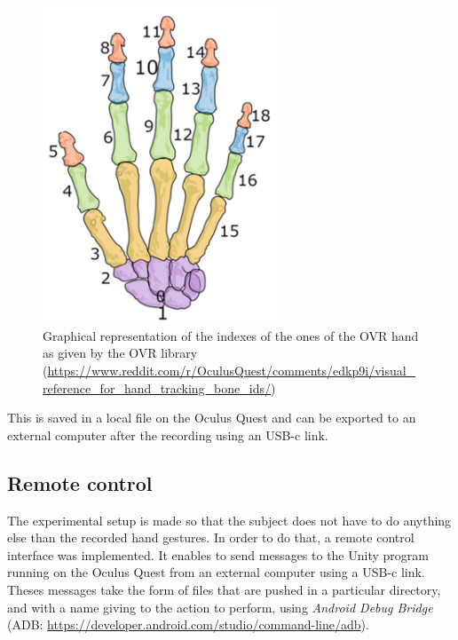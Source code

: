 \documentclass{article}
\begin{document}
\begin{figure}[H]
    \centering
    \includegraphics[width=7cm]{images/ovrHandBonesIndexes.png}
    \caption{Graphical representation of the indexes of the ones of the OVR hand as given by the OVR library (\url{https://www.reddit.com/r/OculusQuest/comments/edkp9i/visual_reference_for_hand_tracking_bone_ids/})}
    \label{fig:ovrHandIndexes}
\end{figure}

This is saved in a local file on the Oculus Quest and can be exported to an external computer after the recording using an USB-c link.


\subsection{Remote control}

The experimental setup is made so that the subject does not have to do anything else than the recorded hand gestures. In order to do that, a remote control interface was implemented. It enables to send messages to the Unity program running on the Oculus Quest from an external computer using a USB-c link. Theses messages take the form of files that are pushed in a particular directory, and with a name giving to the action to perform, using \textit{Android Debug Bridge} (ADB: \url{https://developer.android.com/studio/command-line/adb}).
\end{document}
